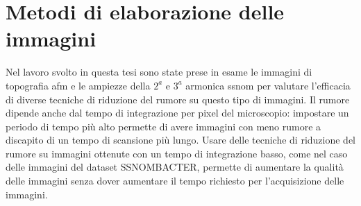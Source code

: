 \documentclass[../main.tex]{subfiles}
\begin{document}
\chapter{Metodi di elaborazione delle immagini}

Nel lavoro svolto in questa tesi sono state prese in esame le immagini di topografia \acrshort{afm} e le ampiezze della $2^a$ e $3^a$ armonica \acrshort{ssnom} per valutare l'efficacia di diverse tecniche di riduzione del rumore su questo tipo di immagini. Il rumore dipende anche dal tempo di integrazione per pixel del microscopio: impostare un periodo di tempo più alto permette di avere immagini con meno rumore a discapito di un tempo di scansione più lungo. Usare delle tecniche di riduzione del rumore su immagini ottenute con un tempo di integrazione basso, come nel caso delle immagini del dataset SSNOMBACTER, permette di aumentare la qualità delle immagini senza dover aumentare il tempo richiesto per l'acquisizione delle immagini.\cite{baiz_2025} 
\end{document}

